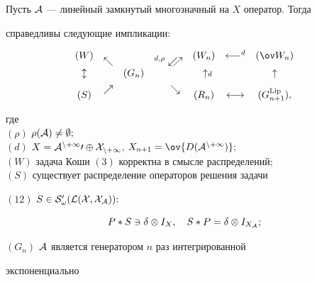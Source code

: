 \begin{thmnonum} 


Пусть $\cal A$ --- линейный замкнутый многозначный на $X$ оператор. Тогда 


справедливы следующие импликации\/${:}$ 


$$ 


\begin{array}{ccccccc} 


(W) & \raisebox{-2mm}{$\nwarrow$} & \ &


\raisebox{-2mm}{${}^{d,\rho}\swarrow\!\!\!\nearrow$}


& (W_n) & \longleftarrow^d  & (\ov W_n) \\ [2mm]


\updownarrow & \ & (G_n) & \ & \phantom{\scriptstyle{d}}\uparrow 


\scriptstyle{d} & & \uparrow \\ [2mm]


(S) & \raisebox{2mm}{$\nearrow$} & \ &


\raisebox{2mm}{${}_{\phantom{d,\rho}}\searrow$} & (R_n) 


& \longleftrightarrow & (G^{\Lip}_{n+1}),


\end{array} 


$$ 


где \\


$(\rho)$ $\rho(\cal A)\ne\emptyset;$  \\


$(d)$ $X=\cal A^{n+1}0\oplus X_{n+1}$, $X_{n+1}=\ov{D(\cal A^{n+1})};$ \\


$(W)$ задача Коши $(3)$ корректна в смысле распределений$;$ \\


$(S)$ существует распределение операторов решения задачи 


$(12)$ $S\in\cal S'_\omega(\cal L(X,X_{\cal A})){:}$ 


$$ 


P\ast S\ni\delta\otimes I_X,\quad 


S\ast P=\delta\otimes I_{X_{\cal A}}; 


$$ 





\noindent{}$(G_n)$ $\cal A$ является генератором $n$ раз интегрированной 


экспоненциально 



\end{thmnonum}
